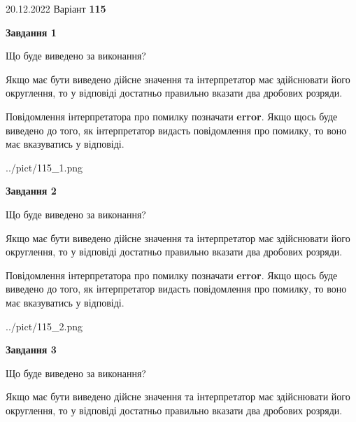 \documentclass[12pt, ukrainian]{article}
\begin{document}
{20.12.2022 Варіант \No \textbf { 115 }\par}
{
\begin {Large}

{\begin {center}\textbf{Завдання 1}\end {center}}\par
Що буде виведено за виконання? \par

Якщо має бути виведено дійсне значення та інтерпретатор має здійснювати його округлення, 
то у відповіді достатньо правильно вказати два дробових розряди.

Повідомлення інтерпретатора про помилку позначати \textbf{error}.
Якщо щось буде виведено до того, як інтерпретатор видасть повідомлення про помилку, 
то воно має вказуватись у відповіді. \par

\begin{center}
	{../pict/115_1.png}
\end{center}
\newpage

{\begin {center}\textbf{Завдання 2}\end {center}}\par
Що буде виведено за виконання? \par

Якщо має бути виведено дійсне значення та інтерпретатор має здійснювати його округлення, 
то у відповіді достатньо правильно вказати два дробових розряди.

Повідомлення інтерпретатора про помилку позначати \textbf{error}.
Якщо щось буде виведено до того, як інтерпретатор видасть повідомлення про помилку, 
то воно має вказуватись у відповіді. \par

\begin{center}
	{../pict/115_2.png}
\end{center}
\newpage

{\begin {center}\textbf{Завдання 3}\end {center}}\par
Що буде виведено за виконання? \par

Якщо має бути виведено дійсне значення та інтерпретатор має здійснювати його округлення, 
то у відповіді достатньо правильно вказати два дробових розряди.


\end{Large}}
\end{document}
